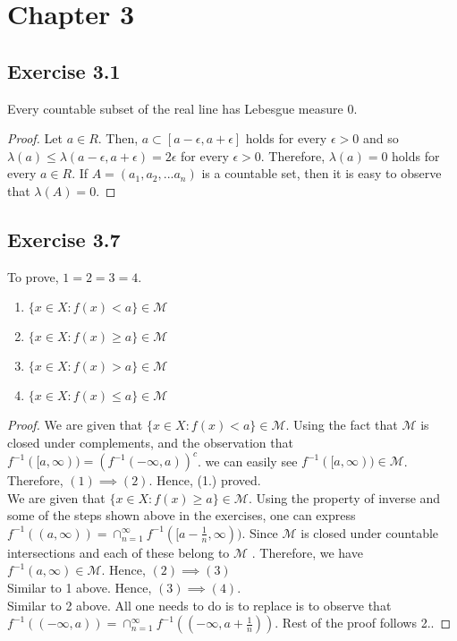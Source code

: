 \documentclass[12pt]{article}
\begin{document}
\section{Chapter 3}

\subsection{Exercise 3.1}

\begin{prop}
	Every countable subset of the real line has Lebesgue measure $0$.
\end{prop}
\begin{proof}
Let $a\in R$. Then, ${a}\subset[a-\epsilon,a+\epsilon]$ holds for every $\epsilon > 0$  and so $\lambda({a})\leq \lambda(a-\epsilon,a+\epsilon)=2\epsilon$  for every $ \epsilon > 0$. Therefore, $\lambda({a})=0$ holds for every $a\in R$. If $A=({a_{1},a_{2},...a_{n}})$ is a countable set, then it is easy to observe that  $\lambda(A)=0$.
\end{proof}

\subsection{Exercise 3.7}

To prove, $1=2=3=4$.
\begin{enumerate}
	\item $\{x \in X : f(x) < a \} \in \mathcal{M}$
	\item $\{x \in X : f(x) \geq a \} \in \mathcal{M}$
	\item $\{x \in X : f(x) > a \} \in \mathcal{M}$
	\item $\{x \in X : f(x) \leq a \} \in \mathcal{M}$
\end{enumerate}
\begin{proof}
	We are given that $\{x \in X : f(x) < a \} \in \mathcal{M}$.  Using the fact that $\mathcal{M}$ is closed under complements, and the observation that  $f^{-1}([a, \infty)) = (f^{-1}(-\infty, a))^c$. we can easily see $f^{-1}([a, \infty)) \in \mathcal{M}$. Therefore, $(1) \implies (2)$. Hence, (1.) proved.\\
	
	We are given that  $\{x \in X : f(x) \geq a \} \in \mathcal{M}$. Using the property of inverse and some of the steps shown above in the exercises, one can express $f^{-1}((a, \infty)) = \cap_{n=1}^{\infty} f^{-1}([a - \frac{1}{n}, \infty))$. Since  $\mathcal{M}$ is closed under countable intersections and each of these belong to $\mathcal{M}$ . Therefore, we have $f^{-1}(a, \infty) \in \mathcal{M}$. Hence, $(2) \implies (3)$\\ 
	
	Similar to 1 above. Hence, $(3) \implies (4)$. \\
	
	Similar to 2 above. All one needs to do is to replace is to observe that $f^{-1}((-\infty, a)) = \cap_{n=1}^{\infty} f^{-1}((-\infty, a + \frac{1}{n}))$. Rest of the proof follows 2..
\end{proof}
\end{document}
